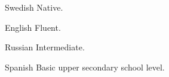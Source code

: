 


\begin{myitemize}
  \item[Swedish] Native.\quad
  \item[English] Fluent.\quad
  \item[Russian] Intermediate.\quad
  \item[Spanish] Basic upper secondary school level.
\end{myitemize}